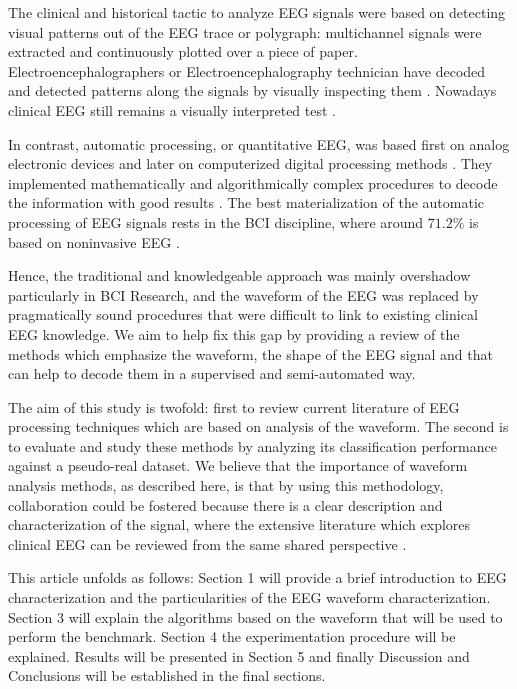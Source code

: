 \documentclass[sensors,article,submit,moreauthors,pdftex,10pt,a4paper]{mdpi}
\begin{document}
The clinical and historical tactic to analyze EEG signals were based on detecting visual patterns out of the EEG trace or polygraph\citep{Hartman2005}: multichannel signals were extracted and continuously plotted over a piece of paper. Electroencephalographers or Electroencephalography technician have decoded and detected patterns along the signals by visually inspecting them \citep{Schomer2010}.   Nowadays clinical EEG still remains a visually interpreted test \citep{Hartman2005}.

In contrast, automatic processing, or quantitative EEG, was based first on analog electronic devices and later on computerized digital processing methods \citep{Jansen1991}.  They implemented mathematically and algorithmically complex procedures to decode the information with good results \citep{Yuste2017}.  The best materialization of the automatic processing of EEG signals rests in the BCI discipline, where around $71.2\%$ is based on noninvasive EEG \citep{Guger2017}.  


Hence, the traditional and knowledgeable approach was mainly overshadow particularly in BCI Research, and the waveform of the EEG was replaced by pragmatically sound procedures that were difficult to link to existing clinical EEG knowledge.  We aim to help fix this gap by providing a review of the methods which emphasize the waveform, the shape of the EEG signal and that can help to decode them in a supervised and semi-automated way.

The aim of this study is twofold: first to review current literature of EEG processing techniques which are based on analysis of the waveform.  The second is to evaluate and study these methods by analyzing its classification performance against a pseudo-real dataset. We believe that the importance of waveform analysis methods, as described here, is that by using this methodology, collaboration could be fostered because there is a clear description and characterization of the signal, where the extensive literature which explores clinical EEG can be reviewed from the same shared perspective \citep{Nijboer2009,Wei2017}. 

This article unfolds as follows: Section 1 will provide a brief introduction to EEG characterization and the particularities of the EEG waveform characterization.  Section 3 will explain the algorithms based on the waveform that will be used to perform the benchmark.  Section 4 the experimentation procedure will be explained.  Results will be presented in Section 5 and finally Discussion and Conclusions will be established in the final sections.
\end{document}
